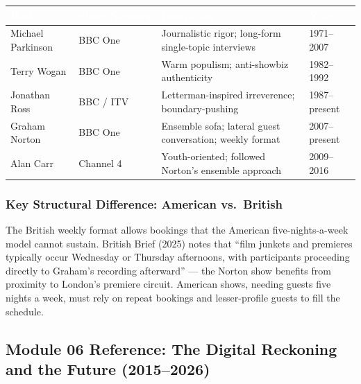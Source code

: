 \documentclass[11pt,letterpaper]{article}
\newcommand{\tableheader}[1]{\textbf{\sffamily\textcolor{white}{#1}}}
\begin{document}
\begin{center}
\begin{tabularx}{\textwidth}{L{3cm}L{2.5cm}XC{1.5cm}}
\toprule
{}
\tableheader{Host} & \tableheader{Show/Network} & \tableheader{Innovation} & \tableheader{Years} \\
\midrule
Michael Parkinson & BBC One & Journalistic rigor; long-form single-topic interviews & 1971--2007 \\
Terry Wogan & BBC One & Warm populism; anti-showbiz authenticity & 1982--1992 \\
Jonathan Ross & BBC / ITV & Letterman-inspired irreverence; boundary-pushing & 1987--present \\
Graham Norton & BBC One & Ensemble sofa; lateral guest conversation; weekly format & 2007--present \\
Alan Carr & Channel 4 & Youth-oriented; followed Norton's ensemble approach & 2009--2016 \\
\bottomrule
\end{tabularx}
\end{center}

\subsubsection{Key Structural Difference: American vs.\ British}
The British weekly format allows bookings that the American five-nights-a-week model cannot sustain. British Brief (2025) notes that ``film junkets and premieres typically occur Wednesday or Thursday afternoons, with participants proceeding directly to Graham's recording afterward'' --- the Norton show benefits from proximity to London's premiere circuit. American shows, needing guests five nights a week, must rely on repeat bookings and lesser-profile guests to fill the schedule.

\subsection{Module 06 Reference: The Digital Reckoning and the Future (2015--2026)}
\end{document}
